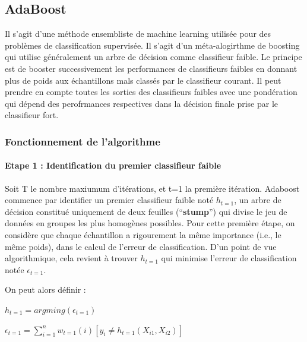 \documentclass[
]{article}
\begin{document}
\hypertarget{adaboost}{%
\subsection{AdaBoost}\label{adaboost}}

Il s'agit d'une méthode ensembliste de machine learning utilisée pour
des problèmes de classification supervisée. Il s'agit d'un
méta-alogirthme de boosting qui utilise généralement un arbre de
décision comme classifieur faible. Le principe est de booster
successivement les performances de classifieurs faibles en donnant plus
de poids aux échantillons mals classés par le classifieur courant. Il
peut prendre en compte toutes les sorties des classifieurs faibles avec
une pondération qui dépend des perofrmances respectives dans la décision
finale prise par le classifieur fort.

\hypertarget{fonctionnement-de-lalgorithme-1}{%
\subsubsection{Fonctionnement de
l'algorithme}\label{fonctionnement-de-lalgorithme-1}}

\hypertarget{etape-1-identification-du-premier-classifieur-faible}{%
\paragraph{Etape 1 : Identification du premier classifieur
faible}\label{etape-1-identification-du-premier-classifieur-faible}}

Soit T le nombre maxiumum d'itérations, et t=1 la première itération.
Adaboost commence par identifier un premier classifieur faible noté
\(h_{t=1}\), un arbre de décision constitué uniquement de deux feuilles
(``\textbf{stump}'') qui divise le jeu de données en groupes les plus
homogènes possibles. Pour cette première étape, on considère que chaque
échantillon a rigourement la même importance (i.e., le même poids), dans
le calcul de l'erreur de classification. D'un point de vue
algorithmique, cela revient à trouver \(h_{t=1}\) qui minimise l'erreur
de classification notée \(\epsilon_{t=1}\).

On peut alors définir :

\begin{center}
  $h_{t=1}=argming(\epsilon_{t=1})$
  
  $\epsilon_{t=1}=\sum^n_{i=1}w_{t=1}(i)[y_i\ne h_{t=1}(X_{i1},X_{i2})]$
\end{center}
\end{document}
